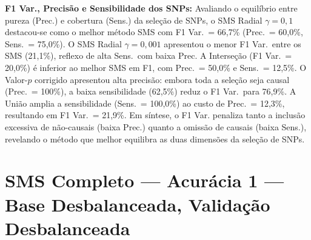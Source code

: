 \documentclass[
    12pt,
    a4paper,
    oneside,
    english,
    french,
    spanish,
    brazil
    ]{abntex2}
\newcommand{\novo}[1]{\textcolor{corNova}{#1}}
\begin{document}
\novo{\textbf{F1 Var., Precisão e Sensibilidade dos SNPs:} Avaliando o equilíbrio entre pureza (Prec.) e cobertura (Sens.) da seleção de SNPs, o SMS Radial $\gamma=0{,}1$ destacou-se como o melhor método SMS com F1 Var.\ = 66,7\% (Prec.\ = 60,0\%, Sens.\ = 75,0\%). O SMS Radial $\gamma=0{,}001$ apresentou o menor F1 Var.\ entre os SMS (21,1\%), reflexo de alta Sens.\ com baixa Prec. A Interseção (F1 Var.\ = 20,0\%) é inferior ao melhor SMS em F1, com Prec.\ = 50,0\% e Sens.\ = 12,5\%. O Valor-$p$ corrigido apresentou alta precisão: embora toda a seleção seja causal (Prec.\ = 100\%), a baixa sensibilidade (62,5\%) reduz o F1 Var.\ para 76,9\%. A União amplia a sensibilidade (Sens.\ = 100,0\%) ao custo de Prec.\ = 12,3\%, resultando em F1 Var.\ = 21,9\%. Em síntese, o F1 Var. penaliza tanto a inclusão excessiva de não-causais (baixa Prec.) quanto a omissão de causais (baixa Sens.), revelando o método que melhor equilibra as duas dimensões da seleção de SNPs.}
\section{SMS Completo --- Acurácia 1 --- Base Desbalanceada, Validação Desbalanceada}
\end{document}
